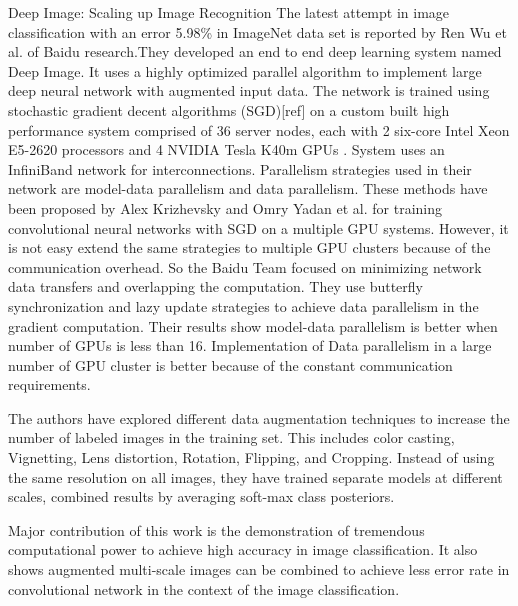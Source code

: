 \documentclass{article}
\begin{document}
\begin{section}{Deep Image: Scaling up Image Recognition}
The latest attempt in image classification with an error 5.98\% in ImageNet data set is reported by  Ren Wu et al. \cite{Wu2015} of Baidu research.They developed an end to end deep learning  system named Deep Image. It uses a highly optimized parallel algorithm  to implement large deep neural network with augmented input data. The network is trained using stochastic gradient decent algorithms (SGD)[ref] on a custom built high performance system comprised of 36 server nodes, each with 2 six-core Intel Xeon E5-2620 processors and 4 NVIDIA Tesla K40m GPUs . System  uses an InfiniBand  network for interconnections. Parallelism strategies used in their network are model-data parallelism and data parallelism.  These methods have been proposed by Alex Krizhevsky \cite{Krizhevsky2014} and Omry Yadan et al. \cite{Yadan2013} for training convolutional neural networks with SGD on a  multiple GPU systems. However, it is not easy extend the same strategies to multiple GPU clusters because of the communication overhead. So the  Baidu Team focused on minimizing network data transfers and overlapping the computation. They use butterfly synchronization and lazy update strategies to achieve data parallelism in the gradient computation. Their results show model-data parallelism is better when number of GPUs is less than 16. Implementation of Data parallelism in a large number  of GPU  cluster is better because of the constant communication requirements.
\par
The authors have explored different data augmentation techniques to increase the number of labeled images in the training set. This includes color casting, Vignetting, Lens distortion, Rotation, Flipping, and  Cropping. Instead of using the same resolution on all images, they have trained separate models at different scales, combined results by averaging soft-max class posteriors.

\par
 Major contribution of this work is the demonstration of tremendous computational power to achieve high accuracy in image classification.
It also shows augmented multi-scale images can be combined to achieve less error rate in convolutional network in the context of the image classification. 
 \end{section}







\end{document}
